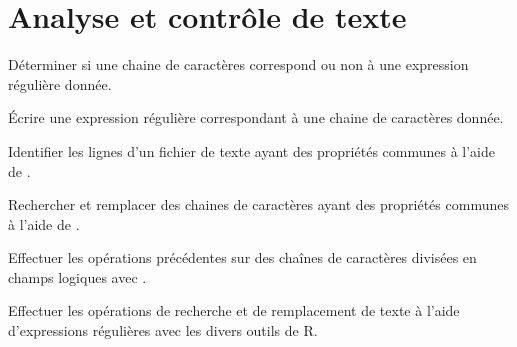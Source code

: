 
\chapter{Analyse et contrôle de texte}
\label{chap:texte}

\begin{objectifs}
\item Déterminer si une chaine de caractères correspond ou non à une
  expression régulière donnée.
\item Écrire une expression régulière correspondant à une chaine de
  caractères donnée.
\item Identifier les lignes d'un fichier de texte ayant des propriétés
  communes à l'aide de .
\item Rechercher et remplacer des chaines de caractères ayant des
  propriétés communes à l'aide de .
\item Effectuer les opérations précédentes sur des chaînes de
  caractères divisées en champs logiques avec .
\item Effectuer les opérations de recherche et de remplacement de
  texte à l'aide d'expressions régulières avec les divers outils de R.
\end{objectifs}

\newpage




